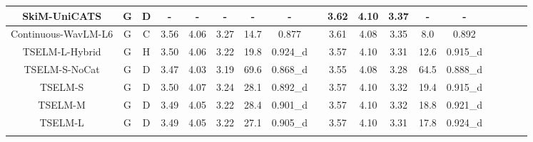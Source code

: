 \documentclass[conference]{IEEEtran}
\begin{document}
\begin{table}
\begin{center}
\begin{tabular}{cccccccccccccccccc}
  SkiM-UniCATS                   & G                                             & D                                                                                  & -        & -      & -       & -            & -     &          & 3.62        & 4.10       & 3.37       & -            & -             \\ \hline
  Continuous-WavLM-L6     & G                                             & C                                                                                  & 3.56        & 4.06       & 3.27       & 14.7            & 0.877     &          & 3.61        & 4.08       & 3.35       & 8.0            & 0.892             \\
  TSELM-L-Hybrid          & G                                             & H                                                                                     & 3.50        & 4.06       & 3.22       & 19.8            & 0.924\_d  &          & 3.57        & 4.10       & 3.31       & 12.6            & 0.915\_d             \\
  TSELM-S-NoCat       & G                                             & D                                                                                   & 3.47        & 4.03       & 3.19       & 69.6            & 0.868\_d    &        & 3.55        & 4.08       & 3.28       & 64.5            & 0.888\_d         \\ \hline
  TSELM-S                 & G                                             & D                                                                                    & 3.50        & 4.07       & 3.24       & 28.1            & 0.892\_d      &      & 3.57        & 4.10       & 3.32       & 19.4            & 0.915\_d            \\
  TSELM-M                 & G                                             & D                                                                                   & 3.49        & 4.05       & 3.22       & 28.4            & 0.901\_d    &        & 3.57        & 4.10       & 3.32       & 18.8            & 0.921\_d             \\
  TSELM-L                 & G                                             & D                                                                                  & 3.49        & 4.05       & 3.22       & 27.1            & 0.905\_d    &        & 3.57        & 4.10       & 3.31       & 17.8            & 0.924\_d        \\
  \Xhline{2\arrayrulewidth} %
  \end{tabular}
  \label{main_exp}
\end{center}
  \end{table}
\end{document}
